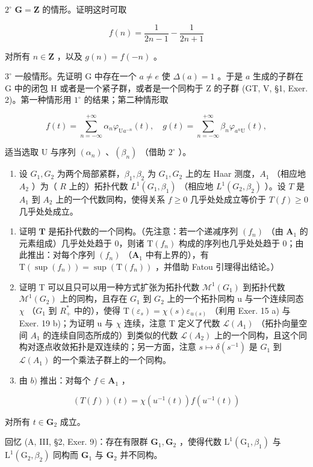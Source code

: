 \(2^{\circ}\) \(\mathbf{G} = \mathbf{Z}\) 的情形。证明这时可取

\[
f (n) = \frac {1}{2 n - 1} - \frac {1}{2 n + 1}
\]

对所有 \(n \in \mathbf{Z}\) ，以及 \(g(n) = f(-n)\) 。

\(3^{\circ}\) 一般情形。先证明 G 中存在一个 \(a \neq e\) 使 \(\Delta(a) = 1\) 。于是 \(a\) 生成的子群在 G 中的闭包 H 或者是一个紧子群，或者是一个同构于 Z 的子群 (GT, V, §1, Exer. 2)。第一种情形用 \(1^{\circ}\) 的结果；第二种情形取

\[
f (t) = \sum_ {n = - \infty} ^ {+ \infty} \alpha_ {n} \varphi_ {\mathrm{U} a ^ {- n}} (t), \quad g (t) = \sum_ {n = - \infty} ^ {+ \infty} \beta_ {n} \varphi_ {a ^ {n} \mathrm{U}} (t),
\]

适当选取 U 与序列 \((\alpha_{n})\) 、\((\beta_{n})\) （借助 \(2^{\circ}\) ）。

\begin{enumerate}
\def\labelenumi{\arabic{enumi})}
\setcounter{enumi}{27}
\tightlist
\item
  设 \(G_1, G_2\) 为两个局部紧群，\(\beta_1, \beta_2\) 为 \(G_1, G_2\) 上的左 Haar 测度，\(A_1\) （相应地 \(A_2\) ）为（ \(R\) 上的）拓扑代数 \(L^1(G_1, \beta_1)\) （相应地 \(L^1(G_2, \beta_2)\) ）。设 \(T\) 是 \(A_1\) 到 \(A_2\) 上的一个代数同构，使得关系 \(f \geqslant 0\) 几乎处处成立等价于 \(T(f) \geqslant 0\) 几乎处处成立。
\end{enumerate}

\begin{enumerate}
\def\labelenumi{\alph{enumi})}
\item
  证明 \(\mathbf{T}\) 是拓扑代数的一个同构。（先注意：若一个递减序列 \((f_n)\) （由 \(\mathbf{A}_1\) 的元素组成）几乎处处趋于 0，则诸 \(\mathrm{T}(f_n)\) 构成的序列也几乎处处趋于 0；由此推出：对每个序列 \((f_n)\) （\(\mathbf{A}_1\) 中有上界的），有 \(\mathrm{T}(\sup (f_n)) = \sup (\mathrm{T}(f_n))\) ，并借助 Fatou 引理得出结论。）
\item
  证明 T 可以且只可以用一种方式扩张为拓扑代数 \(\mathcal{M}^{1}(G_{1})\) 到拓扑代数 \(\mathcal{M}^{1}(G_{2})\) 上的同构，且存在 \(G_{1}\) 到 \(G_{2}\) 上的一个拓扑同构 u 与一个连续同态 \(\chi\) （\(G_{1}\) 到 \(R_{+}^{*}\) 中的），使得 \(\mathrm{T}(\varepsilon_{s}) = \chi(s)\varepsilon_{u(s)}\) （利用 Exer. 15 a) 与 Exer. 19 b)；为证明 u 与 \(\chi\) 连续，注意 T 定义了代数 \(\mathcal{L}(A_{1})\) （拓扑向量空间 \(A_{1}\) 的连续自同态所成的）到类似的代数 \(\mathcal{L}(A_{2})\) 上的一个同构，且这个同构对逐点收敛拓扑是双连续的；另一方面，注意 \(s \mapsto \delta(s^{-1})\) 是 \(G_{1}\) 到 \(\mathcal{L}(A_{1})\) 的一个乘法子群上的一个同构。
\item
  由 \(b)\) 推出：对每个 \(f \in \mathbf{A}_1\) ，
\end{enumerate}

\[
(T (f)) (t) = \chi (u ^ {- 1} (t)) f (u ^ {- 1} (t))
\]

对所有 \(t \in \mathbf{G}_2\) 成立。

回忆 (A, III, §2, Exer. 9)：存在有限群 \(\mathbf{G}_1, \mathbf{G}_2\) ，使得代数 \(\mathrm{L}^1(\mathrm{G}_1, \beta_1)\) 与 \(\mathrm{L}^1(\mathrm{G}_2, \beta_2)\) 同构而 \(\mathbf{G}_1\) 与 \(\mathbf{G}_2\) 并不同构。

